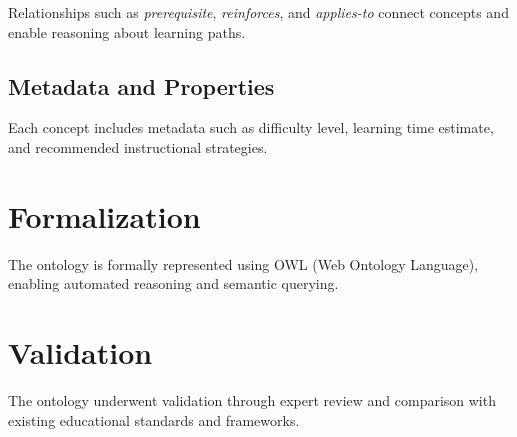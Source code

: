 Relationships such as \textit{prerequisite}, \textit{reinforces}, and \textit{applies-to} connect concepts and enable reasoning about learning paths.

\subsection{Metadata and Properties}

Each concept includes metadata such as difficulty level, learning time estimate, and recommended instructional strategies.

\section{Formalization}

The ontology is formally represented using OWL (Web Ontology Language), enabling automated reasoning and semantic querying.

\section{Validation}

The ontology underwent validation through expert review and comparison with existing educational standards and frameworks.
